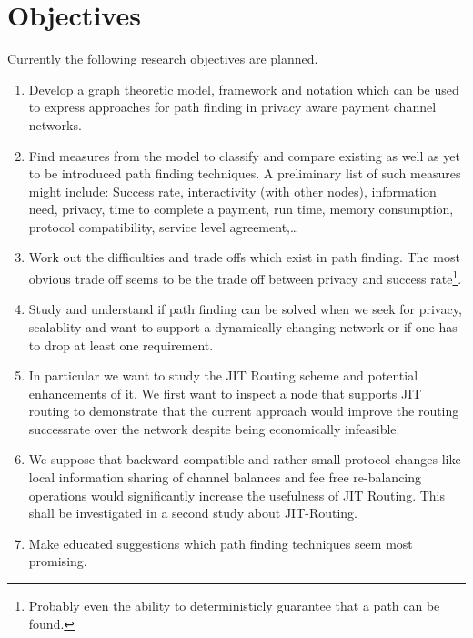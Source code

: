 \documentclass[a4paper]{paper}
\begin{document}
\section{Objectives}
Currently the following research objectives are planned.
\begin{enumerate}
\item Develop a graph theoretic model, framework and notation which can be used to express approaches for path finding in privacy aware payment channel networks.
\item Find measures from the model to classify and compare existing as well as yet to be introduced path finding techniques. A preliminary list of such measures might include: Success rate, interactivity (with other nodes), information need, privacy, time to complete a payment, run time, memory consumption, protocol compatibility, service level agreement,\dots
\item Work out the difficulties and trade offs which exist in path finding. The most obvious trade off seems to be the trade off between privacy and success rate\footnote{Probably even the ability to deterministicly guarantee that a path can be found.}.
\item Study and understand if path finding can be solved when we seek for privacy, scalablity and want to support a dynamically changing network or if one has to drop at least one requirement. 
\item In particular we want to study the JIT Routing scheme and potential enhancements of it. We first want to inspect a node that supports JIT routing to demonstrate that the current approach would improve the routing successrate over the network despite being economically infeasible.
\item We suppose that backward compatible and rather small protocol changes like local information sharing of channel balances and fee free re-balancing operations would significantly increase the usefulness of JIT Routing. This shall be investigated in a second study about JIT-Routing. 
\item Make educated suggestions which path finding techniques seem most promising.
\end{enumerate}
\end{document}
